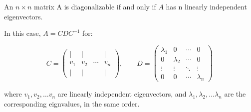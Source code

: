 \begin{theorem}
    An $n \times n$ matrix A is diagonalizable if and only if $A$ has n linearly independent eigenvectors.

    In this case, $A = CDC^{-1}$ for:

    \[
    C = \begin{pmatrix}
        | & | &  & | \\
        v_1 & v_2 & \cdots & v_n \\
        | & | &  & | 
        \end{pmatrix},
        \qquad
    D = \begin{pmatrix}
        \lambda_1 & 0 & \cdots & 0  \\  
        0 & \lambda_2 & \cdots & 0 \\
        \vdots & \vdots & \ddots & \vdots \\
        0 & 0 & \cdots & \lambda_n 
    \end{pmatrix} 
    \]

    where $v_1, v_2, \dots v_n$  are linearly independent eigenvectors, and $\lambda_1, \lambda_2, \dots \lambda_n$ are the corresponding eignvalues, in the same order.
\end{theorem}

